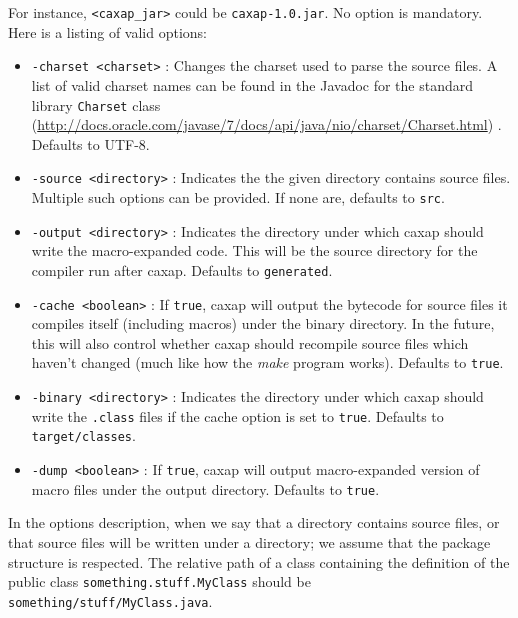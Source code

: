 For instance, \texttt{<caxap_jar>} could be \texttt{caxap-1.0.jar}. No option is
mandatory. Here is a listing of valid options:

\begin{itemize}

\item \texttt{-charset <charset>} : Changes the charset used to parse the source
  files. A list of valid charset names can be found in the Javadoc for the
  standard library \texttt{Charset} class
  (\url{http://docs.oracle.com/javase/7/docs/api/java/nio/charset/Charset.html})
  . Defaults to UTF-8.

\item \texttt{-source <directory>} : Indicates the the given directory contains
  source files. Multiple such options can be provided. If none are, defaults to
  \texttt{src}.

\item \texttt{-output <directory>} : Indicates the directory under which caxap
  should write the macro-expanded code. This will be the source directory for
  the compiler run after caxap. Defaults to \texttt{generated}.

\item \texttt{-cache <boolean>} : If \texttt{true}, caxap will output the
  bytecode for source files it compiles itself (including macros) under the
  binary directory. In the future, this will also control whether caxap should
  recompile source files which haven't changed (much like how the \emph{make}
  program works). Defaults to \texttt{true}.

\item \texttt{-binary <directory>} : Indicates the directory under which caxap
  should write the \texttt{.class} files if the cache option is set to
  \texttt{true}. Defaults to \texttt{target/classes}.

\item \texttt{-dump <boolean>} : If \texttt{true}, caxap will output
  macro-expanded version of macro files under the output directory. Defaults to
  \texttt{true}.

\end{itemize}

In the options description, when we say that a directory contains source files,
or that source files will be written under a directory; we assume that the
package structure is respected. The relative path of a class containing the
definition of the public class \texttt{something.stuff.MyClass} should be
\texttt{something/stuff/MyClass.java}.


